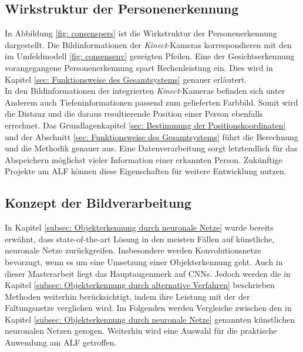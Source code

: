 		\subsection{Wirkstruktur der Personenerkennung}
		\label{subsec: Wirkstrukur Personenerkennung}
		
		
		
		
	
		In Abbildung \ref{fig: consenspers} ist die Wirkstruktur der Personenerkennung dargestellt. Die Bildinformationen der \textit{Kinect}-Kameras korrespondieren mit den im Umfeldmodell \ref{fig: consensenv} gezeigten Pfeilen. Eine der Gesichtserkennung vorangegangene Personenerkennung spart Rechenleistung ein. Dies wird in Kapitel \ref{sec: Funktionsweise des Gesamtsystems} genauer erläutert.\\
		
		In den Bildinformationen der integrierten \textit{Kinect}-Kameras befinden sich unter Anderem auch Tiefeninformationen passend zum gelieferten Farbbild. Somit wird die Distanz und die daraus resultierende Position einer Person ebenfalls errechnet. Das Grundlagenkapitel \ref{sec: Bestimmung der Positionskoordinaten} und der Abschnitt \ref{sec: Funktionsweise des Gesamtsystems} führt die Berechnung und die Methodik genauer aus. Eine Datenverarbeitung sorgt letztendlich für das Abspeichern möglichst vieler Information einer erkannten Person. Zukünftige Projekte am ALF können diese Eigenschaften für weitere Entwicklung nutzen.\\   
		
		\subsection{Konzept der Bildverarbeitung}
		\label{subsec: Auswahl und Training der verwendeten neuronalen Netze}
		
		In Kapitel \ref{subsec: Objekterkennung durch neuronale Netze} wurde bereits erwähnt, dass state-of-the-art Lösung in den meisten Fällen auf künstliche, neuronale Netze zurückgreifen. Insbesondere werden Konvolutionsnetze bevorzugt, wenn es um eine Umsetzung einer Objekterkennung geht. Auch in dieser Masterarbeit liegt das Hauptaugenmerk auf CNNs. Jedoch werden die in Kapitel \ref{subsec: Objekterkennung durch alternative Verfahren} beschrieben Methoden weiterhin berücksichtigt, indem ihre Leistung mit der der Faltungsnetze verglichen wird. Im Folgenden werden Vergleiche zwischen den in Kapitel \ref{subsec: Objekterkennung durch neuronale Netze} genannten künstlichen neuronalen Netzen gezogen. Weiterhin wird eine Auswahl für die praktische Anwendung am ALF getroffen. \\
		

